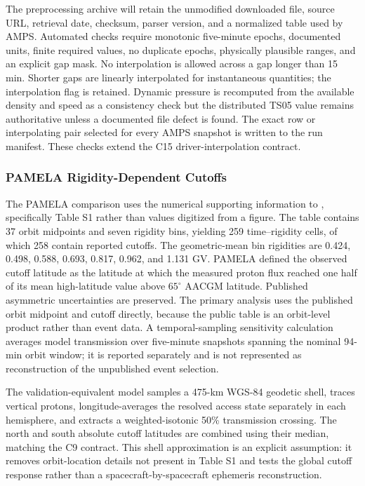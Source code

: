 The preprocessing archive will retain the unmodified downloaded file, source
URL, retrieval date, checksum, parser version, and a normalized table used by
AMPS. Automated checks require monotonic five-minute epochs, documented units,
finite required values, no duplicate epochs, physically plausible ranges, and
an explicit gap mask. No interpolation is allowed across a gap longer than
15 min. Shorter gaps are linearly interpolated for instantaneous quantities;
the interpolation flag is retained. Dynamic pressure is recomputed from the
available density and speed as a consistency check but the distributed TS05
value remains authoritative unless a documented file defect is found. The
exact row or interpolating pair selected for every AMPS snapshot is written to
the run manifest. These checks extend the C15 driver-interpolation contract.

\subsubsection{PAMELA Rigidity-Dependent Cutoffs}

The PAMELA comparison uses the numerical supporting information to
\citet{Adriani-2016-SW}, specifically Table S1 rather than values digitized
from a figure. The table contains 37 orbit midpoints and seven rigidity bins,
yielding 259 time--rigidity cells, of which 258 contain reported cutoffs. The
geometric-mean bin rigidities are 0.424, 0.498, 0.588, 0.693, 0.817, 0.962,
and 1.131 GV. PAMELA defined the observed cutoff latitude as the latitude at
which the measured proton flux reached one half of its mean high-latitude
value above $65^{\circ}$ AACGM latitude. Published asymmetric uncertainties
are preserved. The primary analysis uses the published orbit midpoint and
cutoff directly, because the public table is an orbit-level product rather
than event data. A temporal-sampling sensitivity calculation averages model
transmission over five-minute snapshots spanning the nominal 94-min orbit
window; it is reported separately and is not represented as reconstruction of
the unpublished event selection.

The validation-equivalent model samples a 475-km WGS-84 geodetic shell, traces
vertical protons, longitude-averages the resolved access state separately in
each hemisphere, and extracts a weighted-isotonic 50\% transmission crossing.
The north and south absolute cutoff latitudes are combined using their median,
matching the C9 contract. This shell approximation is an explicit assumption:
it removes orbit-location details not present in Table S1 and tests the global
cutoff response rather than a spacecraft-by-spacecraft ephemeris reconstruction.

